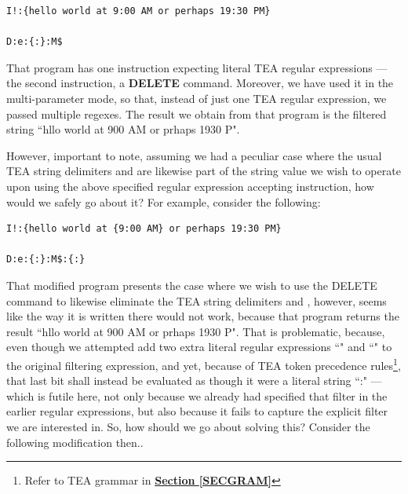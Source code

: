 \documentclass[a4paper, 18pt]{book} %
\begin{document}
{{{\begin{appendices}
  \begin{tcolorbox}[teaterminalstyle, title=TEA Regular Expressions: Example 2: Methods of Writing Literal Regular Expressions Where TEA Regular Expressions are Expected, breakable]
  \begin{lstlisting}[language=TEA,breaklines=true,]
I!:{hello world at 9:00 AM or perhaps 19:30 PM}

D:e:{:}:M$
   \end{lstlisting}
  \end{tcolorbox}

\vspace{2em}


That program has one instruction expecting literal TEA regular expressions --- the second instruction, a \textbf{DELETE} command. Moreover, we have used it in the multi-parameter mode, so that, instead of just one TEA regular expression, we passed multiple regexes. The result we obtain from that program is the filtered string ``hllo world at 900 AM or prhaps 1930 P".

\vspace{2em}

However, important to note, assuming we had a peculiar case where the usual TEA string delimiters { and } are likewise part of the string value we wish to operate upon using the above specified regular expression accepting instruction, how would we safely go about it? For example, consider the following:


\vspace{2em}

  \begin{tcolorbox}[teaterminalstyle, title=TEA Regular Expressions: Example 3: Methods of Writing Literal Regular Expressions Where TEA Regular Expressions are Expected, breakable]
  \begin{lstlisting}[language=TEA,breaklines=true,]
I!:{hello world at {9:00 AM} or perhaps 19:30 PM}

D:e:{:}:M$:{:}
   \end{lstlisting}
  \end{tcolorbox}

\vspace{2em}

That modified program presents the case where we wish to use the DELETE command to likewise eliminate the TEA string delimiters { and }, however, seems like the way it is written there would not work, because that program returns the result ``hllo world at {900 AM} or prhaps 1930 P". That is problematic, because, even though we attempted add two extra literal regular expressions ``{" and ``}" to the original filtering expression, and yet, because of TEA token precedence rules\footnote{Refer to TEA grammar in \textbf{\hyperref[SECGRAM]{Section \ref{SECGRAM}}}}, that last bit shall instead be evaluated as though it were a literal string ``:" --- which is futile here, not only because we already had specified that filter in the earlier regular expressions, but also because it fails to capture the explicit filter we are interested in. So, how should we go about solving this? Consider the following modification then..



\end{appendices}}}}
\end{document}
